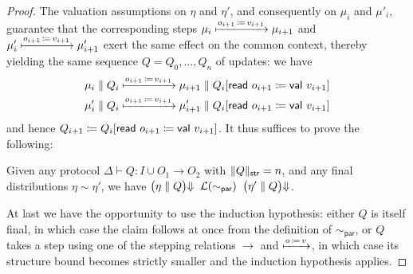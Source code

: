 \begin{proof}
The valuation assumptions on $\eta$ and $\eta'$, and consequently on $\mu_i$ and $\mu'_i$, guarantee that the corresponding steps $\mu_i \xmapsto{o_{i+1} \, \coloneqq \, v_{i+1}} \mu_{i+1}$ and $\mu'_i \xmapsto{o_{i+1} \, \coloneqq \, v_{i+1}} \mu'_{i+1}$ exert the same effect on the common context, thereby yielding the same sequence $Q = Q_0, \ldots, Q_n$ of updates: we have
\begin{align*}
\mu_i \; \| \; Q_i & \xmapsto{o_{i+1} \, \coloneqq \, v_{i+1}} \mu_{i+1} \; \| \; Q_i[\mathsf{read} \ o_{i+1} \coloneqq \mathsf{val} \ v_{i+1}] \\
\mu'_i \; \| \; Q_i & \xmapsto{o_{i+1} \, \coloneqq \, v_{i+1}} \mu'_{i+1} \; \| \; Q_i[\mathsf{read} \ o_{i+1} \coloneqq \mathsf{val} \ v_{i+1}]
\end{align*}
and hence $Q_{i+1} \coloneqq Q_i[\mathsf{read} \ o_{i+1} \coloneqq \mathsf{val} \ v_{i+1}]$. It thus suffices to prove the following: 

\begin{claim}
Given any protocol $\Delta \vdash Q : I \cup O_1 \to O_2$ with $\Vert Q \Vert_{\mathsf{str}} = n$, and any final distributions $\eta \sim \eta'$, we have ${\big(\eta \; \| \; Q\big) \hspace{-2.5pt} \Downarrow} \;\; \mathcal{L}(\sim_\mathsf{par}) \;\; {\big(\eta' \; \| \; Q\big) \hspace{-2.5pt} \Downarrow}$.
\end{claim}

At last we have the opportunity to use the induction hypothesis: either $Q$ is itself final, in which case the claim follows at once from the definition of $\sim_\mathsf{par}$, or $Q$ takes a step using one of the stepping relations $\to$ and $\xmapsto{o \, \coloneqq \, v}$, in which case its structure bound becomes strictly smaller and the induction hypothesis applies.
\end{proof}